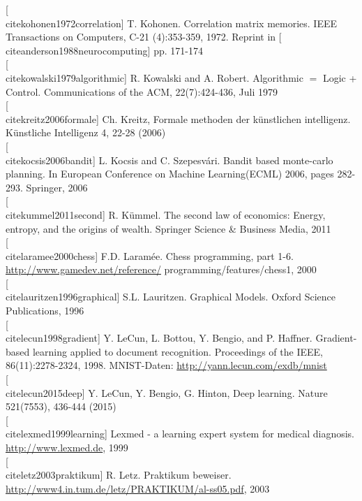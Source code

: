 \documentclass[10pt]{book}
\begin{document}
[\\cite{kohonen1972correlation}] T. Kohonen. Correlation matrix memories. IEEE Transactions on Computers, C-21 (4):353-359, 1972. Reprint in [\\cite{anderson1988neurocomputing}] pp. 171-174\\[0pt]
[\\cite{kowalski1979algorithmic}] R. Kowalski and A. Robert. Algorithmic $=$ Logic + Control. Communications of the ACM, 22(7):424-436, Juli 1979\\[0pt]
[\\cite{kreitz2006formale}] Ch. Kreitz, Formale methoden der künstlichen intelligenz. Künstliche Intelligenz 4, 22-28 (2006)\\[0pt]
[\\cite{kocsis2006bandit}] L. Kocsis and C. Szepesvári. Bandit based monte-carlo planning. In European Conference on Machine Learning(ECML) 2006, pages 282-293. Springer, 2006\\[0pt]
[\\cite{kummel2011second}] R. Kümmel. The second law of economics: Energy, entropy, and the origins of wealth. Springer Science \& Business Media, 2011\\[0pt]
[\\cite{laramee2000chess}] F.D. Laramée. Chess programming, part 1-6. \href{http://www.gamedev.net/reference/}{http://www.gamedev.net/reference/} programming/features/chess1, 2000\\[0pt]
[\\cite{lauritzen1996graphical}] S.L. Lauritzen. Graphical Models. Oxford Science Publications, 1996\\[0pt]
[\\cite{lecun1998gradient}] Y. LeCun, L. Bottou, Y. Bengio, and P. Haffner. Gradient-based learning applied to document recognition. Proceedings of the IEEE, 86(11):2278-2324, 1998. MNIST-Daten: \href{http://yann.lecun.com/exdb/mnist}{http://yann.lecun.com/exdb/mnist}\\[0pt]
[\\cite{lecun2015deep}] Y. LeCun, Y. Bengio, G. Hinton, Deep learning. Nature 521(7553), 436-444 (2015)\\[0pt]
[\\cite{lexmed1999learning}] Lexmed - a learning expert system for medical diagnosis. \href{http://www.lexmed.de}{http://www.lexmed.de}, 1999\\[0pt]
[\\cite{letz2003praktikum}] R. Letz. Praktikum beweiser. \href{http://www4.in.tum.de/letz/PRAKTIKUM/al-ss05.pdf}{http://www4.in.tum.de/letz/PRAKTIKUM/al-ss05.pdf}, 2003\\[0pt]
\end{document}
